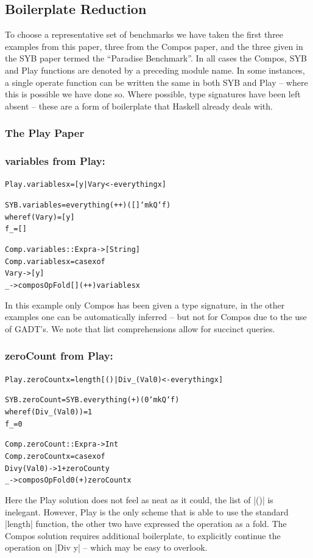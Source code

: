 \documentclass[preprint]{sigplanconf}
\newenvironment{code}{\begin{alltt}\small}{\end{alltt}}
\newcommand{\compare}[2]{\subsubsection*{\textsf{#1} from #2:}\vspace{-1ex}}
\begin{document}
\subsection{Boilerplate Reduction}
\label{sec:results_boilerplate}

To choose a representative set of benchmarks we have taken the first three examples from this paper, three from the Compos paper, and the three given in the SYB paper termed the ``Paradise Benchmark''. In all cases the Compos, SYB and Play functions are denoted by a preceding module name. In some instances, a single operate function can be written the same in both SYB and Play -- where this is possible we have done so. Where possible, type signatures have been left absent -- these are a form of boilerplate that Haskell already deals with.

\subsubsection{The Play Paper}

\compare{variables}{Play}

\begin{code}
Play.variables x = [y | Var y <- everything x]

SYB.variables = everything (++) ([] `mkQ` f)
    where  f (Var y)  = [y]
           f _        = []

Comp.variables :: Expr a -> [String]
Comp.variables x = case x of
    Var y -> [y]
    _ -> composOpFold [] (++) variables x
\end{code}

In this example only Compos has been given a type signature, in the other examples one can be automatically inferred -- but not for Compos due to the use of GADT's. We note that list comprehensions allow for succinct queries.

\compare{zeroCount}{Play}

\begin{code}
Play.zeroCount x = length [() | Div _ (Val 0) <- everything x]

SYB.zeroCount = SYB.everything (+) (0 `mkQ` f)
    where  f (Div _ (Val 0))  = 1
           f _                = 0

Comp.zeroCount :: Expr a -> Int
Comp.zeroCount x = case x of
    Div y (Val 0) -> 1 + zeroCount y
    _ -> composOpFold 0 (+) zeroCount x
\end{code}

Here the Play solution does not feel as neat as it could, the list of |()| is inelegant. However, Play is the only scheme that is able to use the standard |length| function, the other two have expressed the operation as a fold. The Compos solution requires additional boilerplate, to explicitly continue the operation on |Div y| -- which may be easy to overlook.
\end{document}
